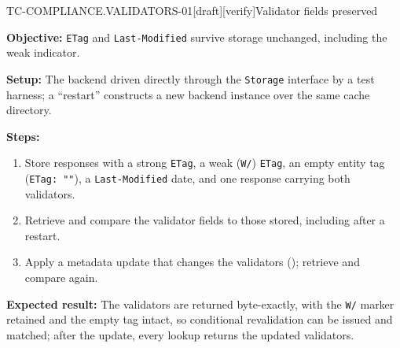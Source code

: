\begin{requirement}{TC-COMPLIANCE.VALIDATORS-01}[draft][verify]{Validator fields preserved}


  \textbf{Objective:} \texttt{ETag} and \texttt{Last-Modified} survive storage
  unchanged, including the weak indicator.

  \textbf{Setup:} The backend driven directly through the \texttt{Storage}
  interface by a test harness; a ``restart'' constructs a new backend instance
  over the same cache directory.

  \textbf{Steps:}
  \begin{enumerate}
    \item Store responses with a strong \texttt{ETag}, a weak (\texttt{W/})
      \texttt{ETag}, an empty entity tag (\texttt{ETag: ""}), a
      \texttt{Last-Modified} date, and one response carrying both validators.
    \item Retrieve and compare the validator fields to those stored, including
      after a restart.
    \item Apply a metadata update that changes the validators
      (); retrieve and compare again.
  \end{enumerate}

  \textbf{Expected result:} The validators are returned byte-exactly, with the
  \texttt{W/} marker retained and the empty tag intact, so conditional
  revalidation can be issued and matched; after the update, every lookup
  returns the updated validators.



\end{requirement}

